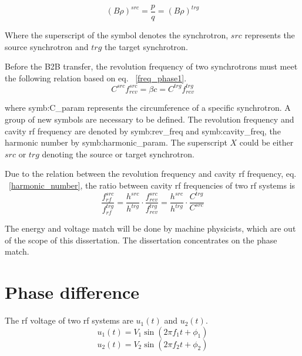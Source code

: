 \begin{equation}
	\label{eq:rigidity}
	(B\rho)^{\mathit{src}} =\frac{p}{q}=(B\rho)^{\mathit{trg}}
\end{equation}

Where the superscript of the symbol denotes the synchrotron, $\mathit{src}$ represents the source synchrotron and $\mathit{trg}$ the target synchrotron. 

Before the B2B transfer, the revolution frequency of two synchrotrons must meet the following relation based on eq. ~\ref{freq_phase1}. 
\begin{equation}
	C^{\mathit{src}}f_{rev}^{\mathit{src}} = \beta c=C^{\mathit{trg}}f_{rev}^{\mathit{trg}}
\end{equation}

where \gls{symb:C_param} represents the circumference of a specific synchrotron. A group of new symbols are necessary to be defined. The revolution frequency and cavity rf frequency are denoted by \gls{symb:rev_freq} and \gls{symb:cavity_freq}, the harmonic number by \gls{symb:harmonic_param}. The superscript $X$ could be either $src$ or $trg$ denoting the source or target synchrotron. 

Due to the relation between the revolution frequency and cavity rf frequency, eq. ~\ref{harmonic_number}, the ratio between cavity rf frequencies of two rf systems is
\begin{equation}
	\frac{f_{rf}^{\mathit{src}}}{f_{rf}^{\mathit{trg}}}=\frac{h^{\mathit{src}}}{h^{\mathit{trg}}}\cdot\frac{f_{rev}^{\mathit{src}}}{f_{rev}^{\mathit{trg}}}=\frac{h^{\mathit{src}}}{h^{\mathit{trg}}}\cdot \frac{C^{\mathit{trg}}}{C^{\mathit{src}}}
\end{equation}

The energy and voltage match will be done by machine physicists, which are out of the scope of this dissertation. The dissertation concentrates on the phase match.
\section{Phase difference}
\label{match}
The rf voltage of two rf systems are $u_1(t)$ and $u_2(t)$.
\begin{equation}
\label{rf_freq1}
	u_1(t)=V_1\sin(2\pi f_1t+\phi_1)
\end{equation}
\begin{equation}
\label{rf_freq2}
	u_2(t)=V_2\sin(2\pi f_2t+\phi_2)
\end{equation}

